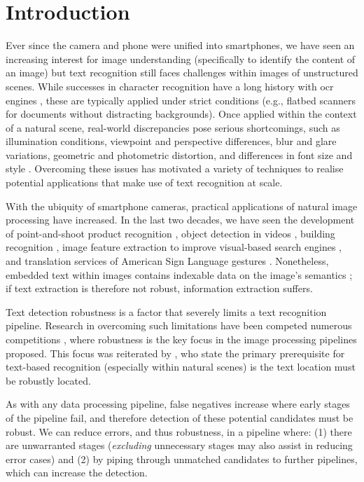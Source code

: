\chapter{Introduction}
\label{ch:introduction}

Ever since the camera and phone were unified into smartphones, we have seen an increasing interest for image understanding (specifically to identify the content of an image) but text recognition still faces challenges within images of unstructured scenes. While successes in character recognition have a long history with \gls{ocr} engines \citep{Smith:1987tg}, these are typically applied under strict conditions (e.g., flatbed scanners for documents without distracting backgrounds). Once applied within the context of a natural scene, real-world discrepancies pose serious shortcomings, such as illumination conditions, viewpoint and perspective differences, blur and glare variations, geometric and photometric distortion, and differences in font size and style \citep{Zhang:2008vfa, Jung:2004uw}. Overcoming these issues has motivated a variety of techniques to realise potential applications that make use of text recognition at scale.

With the ubiquity of smartphone cameras, practical applications of natural image processing have increased. In the last two decades, we have seen the development of point-and-shoot product recognition \citep{Tsai:2010cn,Girod:2011gw}, object detection in videos \citep{Sivic:2003tj}, building recognition \citep{Takacs:2008cg}, image feature extraction to improve visual-based search engines \citep{Lowe:2004kp,Bay:2008ud}, and translation services of American Sign Language gestures \citep{Jin:2016jd}. Nonetheless, embedded text within images contains indexable data on the image's semantics \citep{Smeulders:2000tx}; if text extraction is therefore not robust, information extraction suffers.

Text detection robustness is a factor that severely limits a text recognition pipeline. Research in overcoming such limitations have been competed numerous competitions \citep{Lucas:2003iw, Lucas:2005bq, Shahab:2011hq, Hua:2004vf}, where robustness is the key focus in the image processing pipelines proposed. This focus was reiterated by \citet{Chen:2011ul}, who state the primary prerequisite for text-based recognition (especially within natural scenes) is the text location must be robustly located.

As with any data processing pipeline, false negatives increase where early stages of the pipeline fail, and therefore detection of these potential candidates must be robust. We can reduce errors, and thus robustness, in a pipeline where: (1) there are unwarranted stages (\textit{excluding} unnecessary stages may also assist in reducing error cases) and (2) by piping through unmatched candidates to further pipelines, which can increase the detection.

